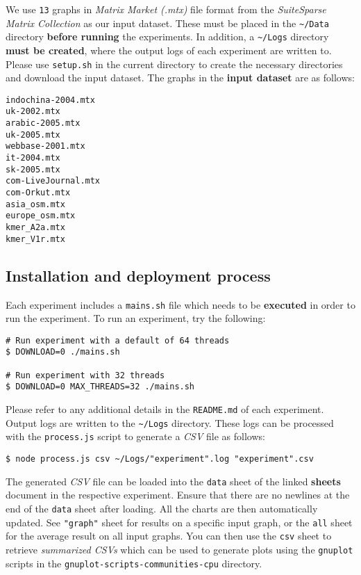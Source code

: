 We use \texttt{13} graphs in \textit{Matrix Market (.mtx)} file format from the \textit{SuiteSparse Matrix Collection} as our input dataset. These must be placed in the \texttt{\textasciitilde{}/Data} directory \textbf{before running} the experiments. In addition, a \texttt{\textasciitilde{}/Logs} directory \textbf{must be created}, where the output logs of each experiment are written to. Please use \texttt{setup.sh} in the current directory to create the necessary directories and download the input dataset. The graphs in the \textbf{input dataset} are as follows:

\begin{verbatim}
indochina-2004.mtx
uk-2002.mtx
arabic-2005.mtx
uk-2005.mtx
webbase-2001.mtx
it-2004.mtx
sk-2005.mtx
com-LiveJournal.mtx
com-Orkut.mtx
asia_osm.mtx
europe_osm.mtx
kmer_A2a.mtx
kmer_V1r.mtx
\end{verbatim}




\subsection{Installation and deployment process}

Each experiment includes a \texttt{mains.sh} file which needs to be \textbf{executed} in order to run the experiment. To run an experiment, try the following:

\begin{verbatim}
# Run experiment with a default of 64 threads
$ DOWNLOAD=0 ./mains.sh

# Run experiment with 32 threads
$ DOWNLOAD=0 MAX_THREADS=32 ./mains.sh
\end{verbatim}

Please refer to any additional details in the \texttt{README.md} of each experiment. Output logs are written to the \texttt{\textasciitilde{}/Logs} directory. These logs can be processed with the \texttt{process.js} script to generate a \textit{CSV} file as follows:

\begin{verbatim}
$ node process.js csv ~/Logs/"experiment".log "experiment".csv
\end{verbatim}

The generated \textit{CSV} file can be loaded into the \texttt{data} sheet of the linked \textbf{sheets} document in the respective experiment. Ensure that there are no newlines at the end of the \texttt{data} sheet after loading. All the charts are then automatically updated. See \texttt{"graph"} sheet for results on a specific input graph, or the \texttt{all} sheet for the average result on all input graphs. You can then use the \texttt{csv} sheet to retrieve \textit{summarized CSVs} which can be used to generate plots using the \texttt{gnuplot} scripts in the \texttt{gnuplot-scripts-communities-cpu} directory.




